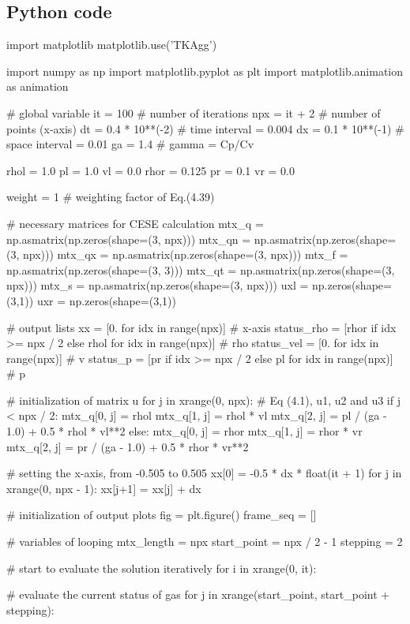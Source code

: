 \documentclass[a4paper,12pt]{article}
\begin{document}
\subsection{Python code}
 \label{subsec:python_code}
\begin{python}
import matplotlib
matplotlib.use('TKAgg')

import numpy as np
import matplotlib.pyplot as plt
import matplotlib.animation as animation

# global variable
it = 100            # number of iterations
npx = it + 2        # number of points (x-axis)
dt = 0.4 * 10**(-2) # time interval = 0.004
dx = 0.1 * 10**(-1) # space interval = 0.01
ga = 1.4            # gamma = Cp/Cv

rhol = 1.0
pl   = 1.0
vl   = 0.0
rhor = 0.125
pr   = 0.1
vr   = 0.0

weight = 1 # weighting factor of Eq.(4.39) 

# necessary matrices for CESE calculation
mtx_q  = np.asmatrix(np.zeros(shape=(3, npx)))
mtx_qn = np.asmatrix(np.zeros(shape=(3, npx)))
mtx_qx = np.asmatrix(np.zeros(shape=(3, npx)))
mtx_f  = np.asmatrix(np.zeros(shape=(3, 3)))
mtx_qt = np.asmatrix(np.zeros(shape=(3, npx)))
mtx_s  = np.asmatrix(np.zeros(shape=(3, npx)))
uxl = np.zeros(shape=(3,1))
uxr = np.zeros(shape=(3,1))

# output lists
xx  = [0. for idx in range(npx)] # x-axis
status_rho  = [rhor if idx >= npx / 2 else rhol for idx in range(npx)] # rho
status_vel  = [0. for idx in range(npx)] # v
status_p  = [pr if idx >= npx / 2 else pl for idx in range(npx)] # p

# initialization of matrix u
for j in xrange(0, npx):
    # Eq (4.1), u1, u2 and u3
    if j < npx / 2:
        mtx_q[0, j] = rhol
        mtx_q[1, j] = rhol * vl
        mtx_q[2, j] = pl / (ga - 1.0) + 0.5 * rhol * vl**2
    else:
        mtx_q[0, j] = rhor
        mtx_q[1, j] = rhor * vr
        mtx_q[2, j] = pr / (ga - 1.0) + 0.5 * rhor * vr**2

# setting the x-axis, from -0.505 to 0.505
xx[0] = -0.5 * dx * float(it + 1)
for j in xrange(0, npx - 1):
    xx[j+1] = xx[j] + dx

# initialization of output plots
fig = plt.figure()
frame_seq = []

# variables of looping 
mtx_length = npx
start_point = npx / 2 - 1
stepping = 2

# start to evaluate the solution iteratively
for i in xrange(0, it):

    # evaluate the current status of gas
    for j in xrange(start_point, start_point + stepping):


\end{python}
\end{document}

